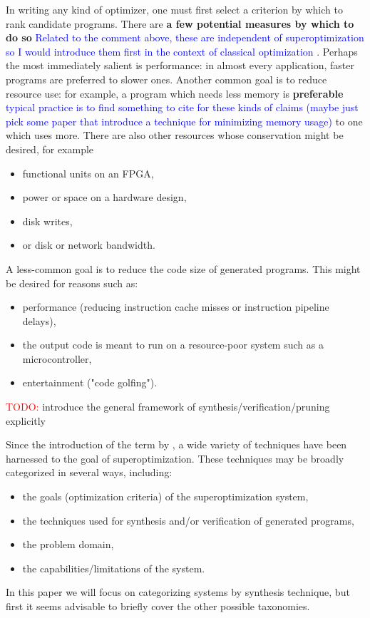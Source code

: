 \documentclass[12pt,twoside]{reedthesis}
\newcommand{\red}[1]{\textcolor{red}{#1}}
\newcommand{\comment}[2]{\textbf{#1} \textcolor{blue}{#2}}
\newcommand{\addressed}[2]{{#1}}
\begin{document}
In writing any kind of optimizer, one must first select a criterion by which to rank candidate programs.
There are
    \comment{a few potential measures by which to do so}{Related to the comment above, these are independent of superoptimization so I would introduce them first in the context of classical optimization}
    .
Perhaps the most immediately salient is performance: 
    in almost every application, faster programs are preferred to slower ones.
Another common goal is to reduce resource use: 
    for example, a program which needs less memory is
        \comment{preferable}{typical practice is to find something to cite for these kinds of claims (maybe just pick some paper that introduce a technique for minimizing memory usage)}
        to one which uses more.
There are also other resources whose conservation might be desired, for example 
\begin{itemize}
    \item functional units on an FPGA, 
    \item power or space on a hardware design, 
    \item disk writes, 
    \item or disk or network bandwidth.
\end{itemize}
A less-common goal is to reduce the code size of generated programs.
This might be desired for reasons such as:
\begin{itemize}
        \item performance (reducing instruction cache misses or instruction pipeline delays), 
        \item the output code is meant to run on a resource-poor system such as a microcontroller, 
        \item entertainment ("code golfing").
\end{itemize}

\red{TODO:} introduce the general framework of synthesis/verification/pruning explicitly

Since the introduction of the term by \cite{massalin1987superoptimizer}, a wide variety of techniques have been harnessed to the goal of superoptimization.
These techniques may be broadly categorized in several ways, including:
    \begin{itemize}
        \item the goals (optimization criteria) of the superoptimization system,
        \item the techniques used for synthesis and/or verification of generated programs,
        \item the problem domain,
        \item the capabilities/limitations of the system.
    \end{itemize}
In this paper we will focus on categorizing systems by synthesis technique, but first it seems advisable to briefly cover the other possible taxonomies.
\end{document}
